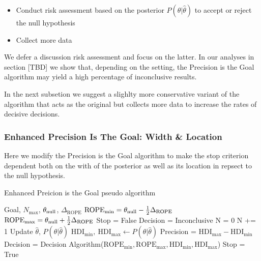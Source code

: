\begin{itemize}
    \item Conduct risk assessment based on the posterior $P(\theta|\hat\theta)$ to accept or reject the null hypothesis
    \item Collect more data
\end{itemize}

We defer a discussion risk assessment and focus on the latter.
In our analyses in section [TBD] we show that, depending on the setting,
the Precision is the Goal algorithm may yield a high percentage of inconclusive results.

In the next subsetion we suggest a slighlty more conservative variant of the algorithm
that acts as the original but collects more data to increase the rates
of decisive decisions.

\subsubsection{Enhanced Precision Is The Goal: Width \& Location}

Here we modify the \cite{kruschke2015doing} Precision is the Goal algorithm
to make the stop criterion dependent both on the with of the posterior
as well as its location in repsect to the null hypothesis.

\begin{algorithm}
    \caption{Enhanced Preicion is the Goal pseudo algorithm}\label{alg:epitg}
    \begin{algorithmic}
    \Require Goal, $N_\mathrm{max}$, $\theta_{\rm null}$, $\Delta_\mathrm{ROPE}$
    \State $\mathrm{ROPE}_\mathrm{min} = \theta_{\rm null} - \frac{1}{2}\Delta_\mathrm{ROPE}$
    \State $\mathrm{ROPE}_\mathrm{max} = \theta_{\rm null} + \frac{1}{2}\Delta_\mathrm{ROPE}$
    \State Stop = False
    \State Decision = Inconclusive
    \State N = 0
    \State N += 1  
    \State Update $\hat\theta$, $P(\theta|\hat\theta)$  
    \State $\mathrm{HDI}_\mathrm{min}, \ \mathrm{HDI}_\mathrm{max}  \gets P(\theta|\hat\theta)$ 
    \State Precision = $\mathrm{HDI}_\mathrm{max} - \mathrm{HDI}_\mathrm{min}$
        \State Decision = Decision Algorithm($\mathrm{ROPE}_\mathrm{min}, \mathrm{ROPE}_\mathrm{max}, \mathrm{HDI}_\mathrm{min}, \mathrm{HDI}_\mathrm{max}$) 
            \State \HiLi Stop = True 
        \EndIf
    \EndIf
    \EndWhile
    \end{algorithmic}
\end{algorithm}


